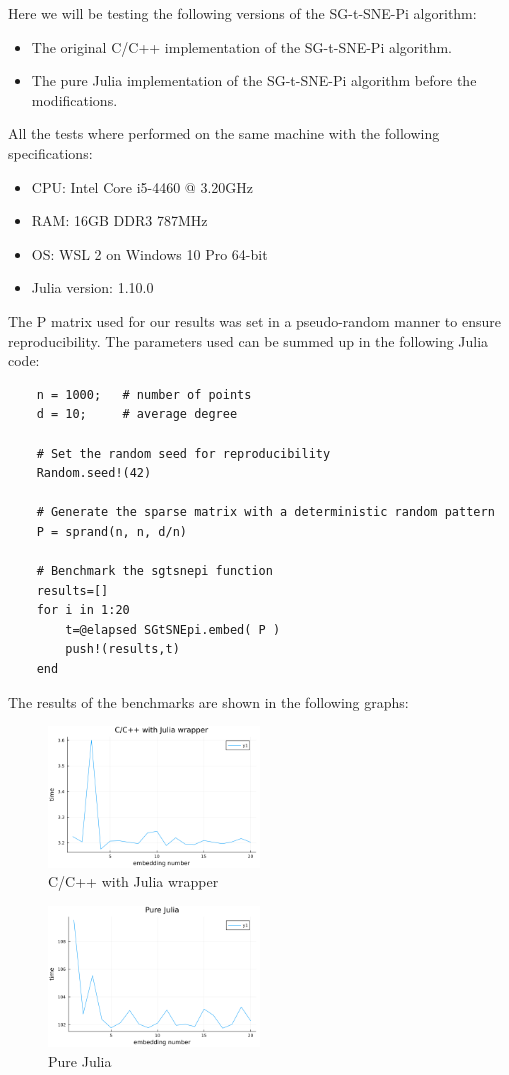Here we will be testing the following versions of the SG-t-SNE-Pi algorithm:
\begin{itemize}
    \item The original C/C++ implementation of the SG-t-SNE-Pi algorithm.
    \item The pure Julia implementation of the SG-t-SNE-Pi algorithm before the modifications.
\end{itemize}
All the tests where performed on the same machine with the following specifications:
\begin{itemize}
    \item CPU: Intel Core i5-4460 @ 3.20GHz
    \item RAM: 16GB DDR3 787MHz
    \item OS: WSL 2 on Windows 10 Pro 64-bit
    \item Julia version: 1.10.0
\end{itemize}
The P matrix used for our results was set in a pseudo-random manner to ensure reproducibility. The parameters
used can be summed up in the following Julia code:
\begin{verbatim} 
    n = 1000;   # number of points
    d = 10;     # average degree
    
    # Set the random seed for reproducibility
    Random.seed!(42)
    
    # Generate the sparse matrix with a deterministic random pattern
    P = sprand(n, n, d/n)

    # Benchmark the sgtsnepi function
    results=[]
    for i in 1:20
        t=@elapsed SGtSNEpi.embed( P )
        push!(results,t)
    end
\end{verbatim}
The results of the benchmarks are shown in the following graphs:
\begin{figure}[H]
    \includegraphics[width=0.5\textwidth]{media/c-c++plot.png}
    \caption{C/C++ with Julia wrapper}
\end{figure}
\begin{figure}[H]
    \includegraphics[width=0.5\textwidth]{media/embed.png}
    \caption{Pure Julia}
\end{figure}